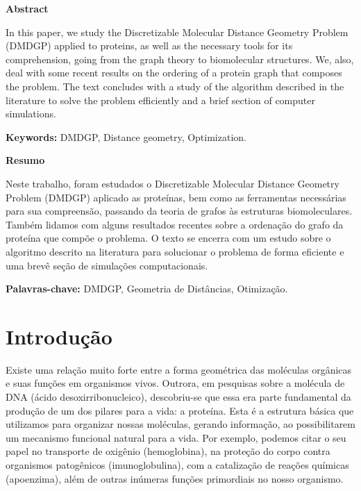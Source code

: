 \documentclass[a4paper,12pt]{article}
\begin{document}
	\begin{center}
		\large
		\textbf{Abstract}
	\end{center}
	
	
	In this paper, we study the Discretizable Molecular Distance Geometry Problem (DMDGP) applied to proteins, as well as the necessary tools for its comprehension, going from the graph theory to biomolecular structures. We, also, deal with some recent results on the ordering of a protein graph that composes the problem. The text concludes with a study of the algorithm described in the literature to solve the problem efficiently and a brief section of computer simulations.
	
	\textbf{Keywords:} DMDGP, Distance geometry, Optimization.
	
	
	\vspace{2cm}	
	\begin{center}
		\large
		\textbf{Resumo}
	\end{center}
	
	Neste trabalho, foram estudados o Discretizable Molecular Distance Geometry Problem (DMDGP) aplicado as proteínas, bem como as ferramentas necessárias para sua compreensão, passando da teoria de grafos às estruturas biomoleculares. Também lidamos com alguns resultados recentes sobre a ordenação do grafo da proteína que compõe o problema. O texto se encerra com um estudo sobre o algoritmo descrito na literatura para solucionar o problema de forma eficiente e uma brevê seção de simulações computacionais.
	
	\textbf{Palavras-chave:} DMDGP, Geometria de Distâncias, Otimização.
	
	
	\newpage
	\section{Introdução}
	Existe uma relação muito forte entre a forma geométrica das moléculas orgânicas e suas funções em organismos vivos. Outrora, em pesquisas sobre a molécula de DNA (ácido desoxirribonucleico), descobriu-se que essa era parte fundamental da produção de um dos pilares para a vida: a proteína. Esta é a estrutura básica que utilizamos para organizar nossas moléculas, gerando informação, ao possibilitarem um mecanismo funcional natural para a vida. Por exemplo, podemos citar o seu papel no transporte de oxigênio (hemoglobina), na proteção do corpo contra organismos patogênicos (imunoglobulina), com a catalização de reações químicas (apoenzima), além de outras inúmeras funções primordiais no nosso organismo.
	
\end{document}
